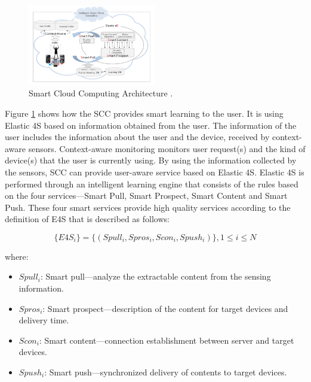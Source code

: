 \documentclass[journal]{vgtc}                %
\begin{document}
  \begin{figure}[htb]
    \centering
    \includegraphics[width=0.5\textwidth]{scc}
    \caption{Smart Cloud Computing Architecture \cite{s110807835}.}
    \label{scc}
  \end{figure}

  Figure \ref{scc} shows how the SCC provides smart learning to the user. It is using Elastic 4S based on information obtained from the user. The information of the user includes the information about the user and the device, received by context-aware sensors. Context-aware monitoring monitors user request(s) and the kind of device(s) that the user is currently using. By using the information collected by the sensors, SCC can provide user-aware service based on Elastic 4S. Elastic 4S is performed through an intelligent learning engine that consists of the rules based on the four services—Smart Pull, Smart Prospect, Smart Content and Smart Push. These four smart services provide high quality services according to the definition of E4S that is described as follows:

  \begin{equation}
    \{E4S_i\}=\{(Spull_i , Spros_i, Scon_i, Spush_i)\}, 1\leq i \leq N
  \end{equation}

  where:

  \begin{itemize}
    \item[] $Spull_i$: Smart pull—analyze the extractable content from the sensing information. 
    \item[] $Spros_i$: Smart prospect—description of the content for target devices and delivery time.
    \item[] $Scon_i$: Smart content—connection establishment between server and target devices.
    \item[] $Spush_i$: Smart push—synchronized delivery of contents to target devices.
  \end{itemize}
\end{document}

